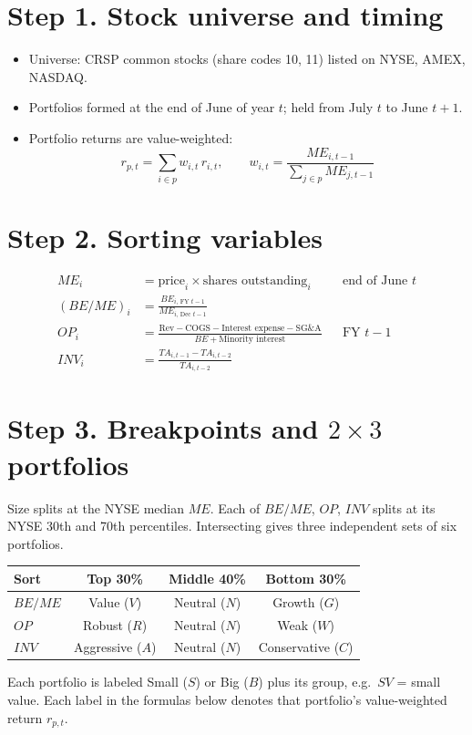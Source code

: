 \documentclass[11pt]{article}
\newcommand{\ME}{\mathit{ME}}
\newcommand{\BE}{\mathit{BE}}
\newcommand{\OP}{\mathit{OP}}
\newcommand{\INV}{\mathit{INV}}
\newcommand{\TA}{\mathit{TA}}
\begin{document}
\section*{Step 1. Stock universe and timing \normalfont\small\cite{kf}}
\begin{itemize}
  \item Universe: CRSP common stocks (share codes 10, 11) listed on NYSE, AMEX, NASDAQ.
  \item Portfolios formed at the end of June of year $t$; held from July $t$ to June $t+1$.
  \item Portfolio returns are value-weighted:
  \begin{equation}
    r_{p,t}=\sum_{i\in p} w_{i,t}\,r_{i,t},\qquad w_{i,t}=\frac{\ME_{i,t-1}}{\sum_{j\in p}\ME_{j,t-1}}
  \end{equation}
\end{itemize}

\section*{Step 2. Sorting variables \normalfont\small\cite{ff15,kf}}
\begin{align}
\ME_i &= \text{price}_i\times\text{shares outstanding}_i && \text{end of June } t\\
(\BE/\ME)_i &= \frac{\BE_{i,\,\text{FY }t-1}}{\ME_{i,\,\text{Dec }t-1}}\\
\OP_i &= \frac{\text{Rev}-\text{COGS}-\text{Interest expense}-\text{SG\&A}}{\BE+\text{Minority interest}} && \text{FY } t-1\\
\INV_i &= \frac{\TA_{i,t-1}-\TA_{i,t-2}}{\TA_{i,t-2}}
\end{align}

\section*{Step 3. Breakpoints and $2\times3$ portfolios \normalfont\small\cite{ff15,kf}}
Size splits at the NYSE median $\ME$. Each of $\BE/\ME$, $\OP$, $\INV$ splits at its NYSE 30th and 70th percentiles.
Intersecting gives three independent sets of six portfolios.

\begin{center}
\begin{tabular}{lccc}
\toprule
Sort & Top 30\% & Middle 40\% & Bottom 30\% \\
\midrule
$\BE/\ME$ & Value ($V$) & Neutral ($N$) & Growth ($G$) \\
$\OP$ & Robust ($R$) & Neutral ($N$) & Weak ($W$) \\
$\INV$ & Aggressive ($A$) & Neutral ($N$) & Conservative ($C$) \\
\bottomrule
\end{tabular}
\end{center}
Each portfolio is labeled Small ($S$) or Big ($B$) plus its group, e.g.\ $SV$ = small value.
Each label in the formulas below denotes that portfolio's value-weighted return $r_{p,t}$.
\end{document}
